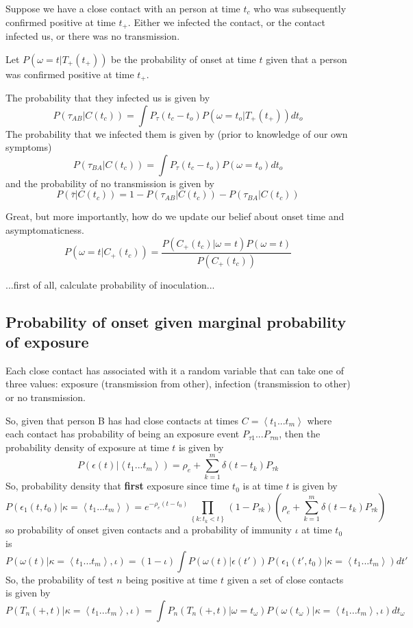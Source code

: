 \documentclass{article}
\begin{document}
Suppose we have a close contact with an person at time $t_c$ who was subsequently confirmed positive at time $t_+$. Either we infected the contact, or the contact infected us, or there was no transmission.

Let $P(\omega = t|T_+(t_+))$ be the probability of onset at time $t$ given that a person was confirmed positive at time $t_+$.

The probability that they infected us is given by
\[
P(\tau_{AB}|C(t_c)) = \int P_\tau(t_c-t_o)P(\omega = t_o|T_+(t_+)) dt_o
\]
The probability that we infected them is given by (prior to knowledge of our own symptoms)
\[
P(\tau_{BA}|C(t_c)) = \int P_\tau(t_c-t_o)P(\omega = t_o) dt_o
\]
and the probability of no transmission is given by
\[
P(\bar{\tau}|C(t_c)) = 1 - P(\tau_{AB}|C(t_c)) - P(\tau_{BA}|C(t_c))
\]

Great, but more importantly, how do we update our belief about onset time and asymptomaticness.
\[
P(\omega = t|C_+(t_c)) = \frac{P(C_+(t_c)|\omega=t)P(\omega=t)}{P(C_+(t_c))}
\] 

...first of all, calculate probability of inoculation...

\subsection{Probability of onset given marginal probability of exposure}

Each close contact has associated with it a random variable that can take one of three values: exposure (transmission from other), infection (transmission to other) or no transmission.

So, given that person B has had close contacts at times $C = \left<t_1...t_m\right>$ where each contact has probability of being an exposure event $P_{\tau 1}...P_{\tau m}$, then the probability density of exposure at time $t$ is given by
\[
P(\epsilon(t)|\left<t_1...t_m\right>) = \rho_e + \sum_{k=1}^m \delta(t-t_k)P_{\tau k}
\]
So, probability density that \textbf{first} exposure since time $t_0$ is at time $t$ is given by
\[
P(\epsilon_1(t,t_0)|\kappa = \left<t_1...t_m\right>) = e^{-\rho_e(t-t_0)} \prod_{\left\{k:t_k<t\right\}}\left(1 -   P_{\tau k} \right)\left(\rho_e + \sum_{k=1}^m \delta(t-t_k)P_{\tau k}\right)
\]
so probability of onset given contacts and a probability of immunity $\iota$ at time $t_0$ is
\[
P(\omega(t)|\kappa=\left<t_1...t_m\right>,\iota) = (1-\iota)\int P(\omega(t)|\epsilon(t'))P(\epsilon_1(t',t_0)|\kappa = \left<t_1...t_m\right>) dt'
\]
So, the probability of test $n$ being positive at time $t$ given a set of close contacts is given by
\[
P(T_n(+,t)|\kappa=\left<t_1...t_m\right>,\iota) = \int P_n(T_n(+,t)|\omega =t_\omega)P(\omega (t_\omega )|\kappa=\left<t_1...t_m\right>,\iota) dt_\omega
\]
\end{document}
